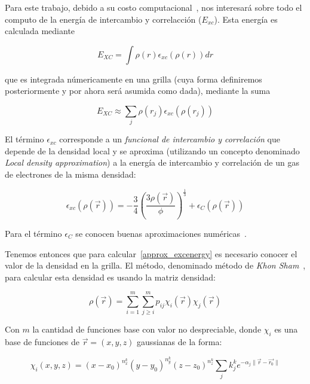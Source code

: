 Para este trabajo, debido a su costo computacional~\cite{PaperNitscheManu}, nos interesar\'a sobre todo el computo de la energ\'ia de intercambio y correlacci\'on ($E_{xc}$).
Esta energ\'ia es calculada mediante 

\begin{equation}
    E_{XC} = \int \rho(r) \epsilon_{xc}(\rho(r)) dr
\end{equation}

que es integrada n\'umericamente en una grilla (cuya forma definiremos posteriormente y por ahora ser\'a asumida como dada), mediante la suma

\begin{equation}
    \label{approx_excenergy}
    E_{XC} \approx \sum_j \rho(r_j) \epsilon_{xc} (\rho(r_j))
\end{equation}

El t\'ermino $\epsilon_{xc}$ corresponde a un \textit{funcional de intercambio y correlaci\'on} que depende de la densidad local y
se aproxima (utilizando un concepto denominado \textit{Local density approximation}) a la energ\'ia de intercambio y correlaci\'on de 
un gas de electrones de la misma densidad:

\begin{equation}
    \epsilon_{xc}(\rho(\vec{r})) = -\frac{3}{4} (\frac{3 \rho(\vec{r})}{\phi})^{\frac{1}{3}} + \epsilon_{C}(\rho(\vec{r}))
\end{equation}

Para el t\'ermino $\epsilon_{C}$ se conocen buenas aproximaciones num\'ericas~\cite{Vosko}.

Tenemos entonces que para calcular~\ref{approx_excenergy} es necesario conocer el valor de la densidad en la grilla.
El m\'etodo, denominado m\'etodo de \textit{Khon Sham}~\cite{KohnSham}, para calcular esta densidad es usando la matriz densidad:

\begin{equation}
    \rho(\vec{r}) = \sum_{i = 1}^{m} \sum_{j \geq i}^{m} p_{ij} \chi_i(\vec{r}) \chi_j(\vec{r})
\end{equation}

Con $m$ la cantidad de funciones base con valor no despreciable, donde $\chi_i$ es una base de funciones de $\vec{r} = (x,y,z)$ gaussianas de la forma:

\begin{equation}
    \chi_i(x,y,z) = (x - x_0)^{n_x^k} (y - y_0)^{n_y^k} (z - z_0) ^{n_z^k} \sum_j k_j^k e^{-\alpha_j \| \vec{r} - \vec{r_0} \| }
\end{equation}


